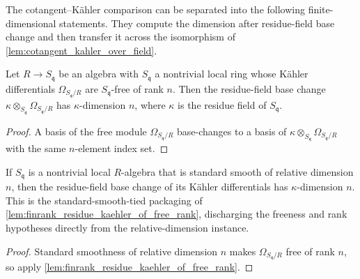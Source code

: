 The cotangent--K\"ahler comparison can be separated into the following
finite-dimensional statements.  They compute the dimension after residue-field
base change and then transfer it across the isomorphism of
\cref{lem:cotangent_kahler_over_field}.

\begin{lemma}\leanok
  \label{lem:finrank_residue_kaehler_of_free_rank}
  Let \(R \to S_{\mathfrak q}\) be an algebra with \(S_{\mathfrak q}\) a nontrivial
  local ring whose K\"ahler differentials \(\Omega_{S_{\mathfrak q}/R}\) are
  \(S_{\mathfrak q}\)-free of rank \(n\). Then the residue-field base change
  \(\kappa \otimes_{S_{\mathfrak q}} \Omega_{S_{\mathfrak q}/R}\) has
  \(\kappa\)-dimension \(n\), where \(\kappa\) is the residue field of \(S_{\mathfrak q}\).
\end{lemma}

\begin{proof}
  A basis of the free module \(\Omega_{S_{\mathfrak q}/R}\) base-changes to a
  basis of \(\kappa \otimes_{S_{\mathfrak q}}\Omega_{S_{\mathfrak q}/R}\)
  with the same \(n\)-element index set.
\end{proof}

\begin{lemma}
  \label{lem:finrank_residue_kaehler_of_standardSmooth_reldim}
  If \(S_{\mathfrak q}\) is a nontrivial local \(R\)-algebra that is standard smooth
  of relative dimension \(n\), then the residue-field base change of its K\"ahler
  differentials has \(\kappa\)-dimension \(n\). This is the standard-smooth-tied
  packaging of \cref{lem:finrank_residue_kaehler_of_free_rank}, discharging the
  freeness and rank hypotheses directly from the relative-dimension instance.
\end{lemma}

\begin{proof}
  Standard smoothness of relative dimension \(n\) makes
  \(\Omega_{S_{\mathfrak q}/R}\) free of rank \(n\), so apply
  \cref{lem:finrank_residue_kaehler_of_free_rank}.
\end{proof}

